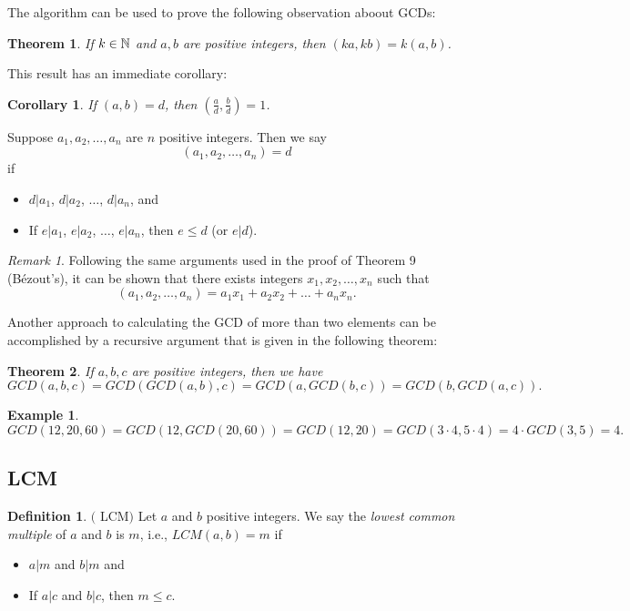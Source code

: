 \documentclass[12pt]{article}
\theoremstyle{plain}
\newtheorem{corollary}{Corollary}
\newtheorem{example}{Example}
\newtheorem{theorem}{Theorem}
\theoremstyle{definition}
\newtheorem{definition}{Definition}
\theoremstyle{remark}
\newtheorem{remark}{Remark}
\begin{document}
\bigskip
The algorithm can be used to prove the following observation aboout GCDs:
\begin{theorem}\label{factorout}
If $k\in \mathbb{N}$ and $a, b$ are positive integers, then $(ka, kb) = k(a,b)$.
\end{theorem}

\bigskip
This result has an immediate corollary:
\begin{corollary}
If $(a,b)=d$, then $(\frac{a}{d}, \frac{b}{d}) =1$.
\end{corollary}

\bigskip
{} Suppose $a_1, a_2, \dots, a_n$ are $n$ positive integers. Then we say
$$(a_1, a_2, \dots, a_n) = d$$ if
\begin{itemize}
    \item $d|a_1$, $d|a_2$, $\dots$, $d|a_n$, and
    \item If $e|a_1$, $e|a_2$, $\dots$, $e|a_n$, then $e\leq d$ (or $e|d$).
\end{itemize}

\begin{remark}
Following the same arguments used in the proof of Theorem 9 (B\'ezout's), it can be shown that there exists integers $x_1, x_2, \dots, x_n$ such that
$$(a_1, a_2, \dots, a_n) = a_1x_1+a_2x_2+\dots +a_nx_n.$$
\end{remark}

\bigskip
\noindent
Another approach to calculating the GCD of more than two elements can be accomplished by a recursive argument that is given in the following theorem:
\begin{theorem}
If $a, b, c$ are positive integers, then we have
$$GCD(a,b,c) = GCD(GCD(a,b),c) = GCD(a, GCD(b,c)) = GCD(b,GCD(a,c)).$$
\end{theorem}

\bigskip
\begin{example}
$GCD(12, 20, 60) = GCD(12,GCD(20,60)) = GCD(12,20)=GCD(3\cdot 4, 5\cdot 4) = 4\cdot GCD(3,5)=4.$
\end{example}

\subsection{LCM}
\begin{definition}$($ LCM$)$
Let $a$ and $b$ positive integers. We say the {\it lowest common multiple} of $a$ and $b$ is $m$, i.e., $LCM(a,b) = m$ if
\begin{itemize}
    \item $a|m$ and $b|m$ and
    \item If $a|c$ and $b|c$, then $m\leq c$.
\end{itemize}
\end{definition}
\end{document}
